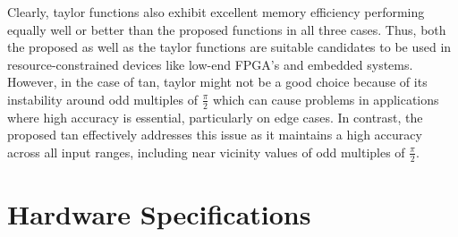 \documentclass[12pt,twoside, letterpaper, margin=1in]{article}
\begin{document}
Clearly, taylor functions also exhibit excellent memory efficiency  performing equally well or better than the proposed functions in all three cases. Thus, both the proposed as well as the taylor functions are suitable candidates to be used in resource-constrained devices like low-end FPGA's and embedded systems. 
However, in the case of tan, taylor might not be a good choice because of its instability around odd multiples of $\frac{\pi}{2}$ which can cause problems in applications where high accuracy is essential, particularly on edge cases. 
In contrast, the proposed tan effectively addresses this issue as it maintains a high accuracy across all input ranges, including near vicinity values of odd multiples of $\frac{\pi}{2}$.


\section*{Hardware Specifications}
\label{hardware}
\end{document}
